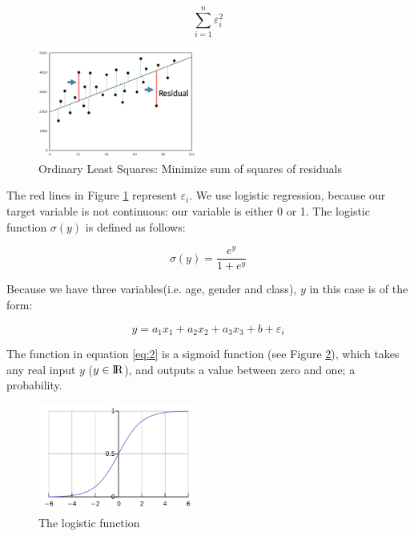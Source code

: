 \documentclass[11pt]{article}
\begin{document}
\begin{equation}
\label{eq:residual}
\sum_{i=1}^{n}\varepsilon^2_{i}
\end{equation}



\begin{figure}[htbp]
\centering
\includegraphics[width=200px]{./Residual.png}
\caption{\label{tab:ols}
Ordinary Least Squares: Minimize sum of squares of residuals}
\end{figure}

The red lines in Figure \ref{tab:ols} represent \(\varepsilon_{i}\). We use logistic regression, because our target variable is not continuous: our variable is either 0 or 1. The logistic function \(\sigma(y)\) is defined as follows:

\begin{equation}
\label{eq:2}
\sigma(y) = \frac{e^y}{1+e^y}
\end{equation}

Because we have three variables(i.e. age, gender and class), \(y\) in this case is of the form:

\begin{equation}
y=a_1x_1+a_2x_2+a_3x_3+b+\varepsilon_{i} 
\end{equation}

The function in equation \ref{eq:2} is a sigmoid function (see Figure \ref{tab:log}), which takes any real input \(y\) (\(y\in{\rm I\!R}\)), and outputs a value between zero and one; a probability.

\begin{figure}[htbp]
\centering
\includegraphics[width=200px]{./LogisticCurve.png}
\caption{\label{tab:log}
The logistic function}
\end{figure}
\end{document}
